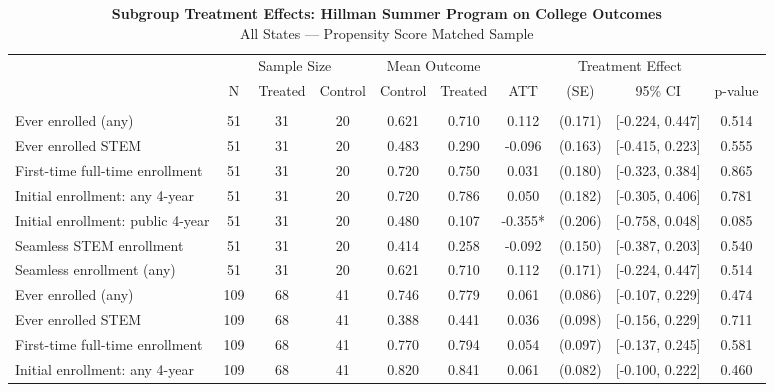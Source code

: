 \begin{table}[t]
\caption*{
{\fontsize{10}{12}\selectfont  \textbf{Subgroup Treatment Effects: Hillman Summer Program on College Outcomes}\fontsize{8}{10}\selectfont } \\ 
{\fontsize{8}{10}\selectfont  All States — Propensity Score Matched Sample\fontsize{8}{10}\selectfont }
} 
\fontsize{8.0pt}{10.0pt}\selectfont
\begin{tabular*}{\linewidth}{@{\extracolsep{\fill}}l|ccccccccc}
\toprule
 & \multicolumn{3}{c}{Sample Size} & \multicolumn{2}{c}{Mean Outcome} & \multicolumn{4}{c}{Treatment Effect} \\ 
\cmidrule(lr){2-4} \cmidrule(lr){5-6} \cmidrule(lr){7-10}
 & N & Treated & Control & Control & Treated & ATT & (SE) & 95\% CI & p-value \\ 
\midrule\addlinespace[2.5pt]
\multicolumn{10}{l}{{\itshape \textbf{Panel A: Enrollment Outcomes} \emph{(full matched subgroup sample)}}} \\[2.5pt] 
\midrule\addlinespace[2.5pt]
Ever enrolled (any) & {51} & {31} & {20} & {0.621} & {0.710} & {0.112} & {(0.171)} & {[-0.224, 0.447]} & {0.514} \\ 
Ever enrolled STEM & 51 & 31 & 20 & 0.483 & 0.290 & -0.096 & (0.163) & [-0.415, 0.223] & 0.555 \\ 
First-time full-time enrollment & 51 & 31 & 20 & 0.720 & 0.750 & 0.031 & (0.180) & [-0.323, 0.384] & 0.865 \\ 
Initial enrollment: any 4-year & 51 & 31 & 20 & 0.720 & 0.786 & 0.050 & (0.182) & [-0.305, 0.406] & 0.781 \\ 
Initial enrollment: public 4-year & 51 & 31 & 20 & 0.480 & 0.107 & -0.355* & (0.206) & [-0.758, 0.048] & 0.085 \\ 
Seamless STEM enrollment & 51 & 31 & 20 & 0.414 & 0.258 & -0.092 & (0.150) & [-0.387, 0.203] & 0.540 \\ 
Seamless enrollment (any) & 51 & 31 & 20 & 0.621 & 0.710 & 0.112 & (0.171) & [-0.224, 0.447] & 0.514 \\ 
Ever enrolled (any) & 109 & 68 & 41 & 0.746 & 0.779 & 0.061 & (0.086) & [-0.107, 0.229] & 0.474 \\ 
Ever enrolled STEM & 109 & 68 & 41 & 0.388 & 0.441 & 0.036 & (0.098) & [-0.156, 0.229] & 0.711 \\ 
First-time full-time enrollment & 109 & 68 & 41 & 0.770 & 0.794 & 0.054 & (0.097) & [-0.137, 0.245] & 0.581 \\ 
Initial enrollment: any 4-year & 109 & 68 & 41 & 0.820 & 0.841 & 0.061 & (0.082) & [-0.100, 0.222] & 0.460 \\ 

\end{tabular*}
\end{table}
